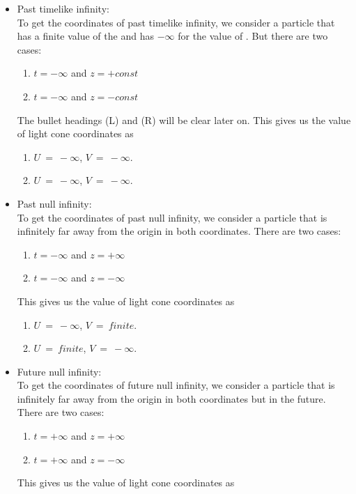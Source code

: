 \begin{itemize}
    \item Past timelike infinity: \iminus\\
            To get the coordinates of past timelike infinity, we consider a particle that has a finite value of the \coordz and has $-\infty$ for the value of \coordt. But there are two cases: \begin{enumerate}
     \item[(R)] $t = -\infty$ and $z = + const$
     \item[(L)] $t = -\infty$ and $z = - const$
 \end{enumerate}
The bullet headings (L) and (R) will be clear later on. This gives us the value of light cone coordinates as \begin{enumerate}
    \item[(R)]  $U~=~-\infty$, $V~=~-\infty$.
    \item[(L)]  $U~=~-\infty$, $V~=~-\infty$.
\end{enumerate}    
    \item Past null infinity: \scrim\\
        To get the coordinates of past null infinity, we consider a particle that is infinitely far away from the origin in both coordinates. There are two cases: \begin{enumerate}
     \item[(R)] $t = -\infty$ and $z = + \infty$
     \item[(L)] $t = -\infty$ and $z = - \infty$
 \end{enumerate}
This gives us the value of light cone coordinates as \begin{enumerate}
    \item[(R)]  $U~=~-\infty$, $V~=~finite$.
    \item[(L)]  $U~=~finite$, $V~=~-\infty$.
\end{enumerate} 
    \item Future null infinity: \scrip\\
            To get the coordinates of future null infinity, we consider a particle that is infinitely far away from the origin in both coordinates but in the future. There are two cases: \begin{enumerate}
     \item[(R)] $t = +\infty$ and $z = + \infty$
     \item[(L)] $t = +\infty$ and $z = - \infty$
 \end{enumerate}
This gives us the value of light cone coordinates as \begin{enumerate}

\end{enumerate}
\end{itemize}

